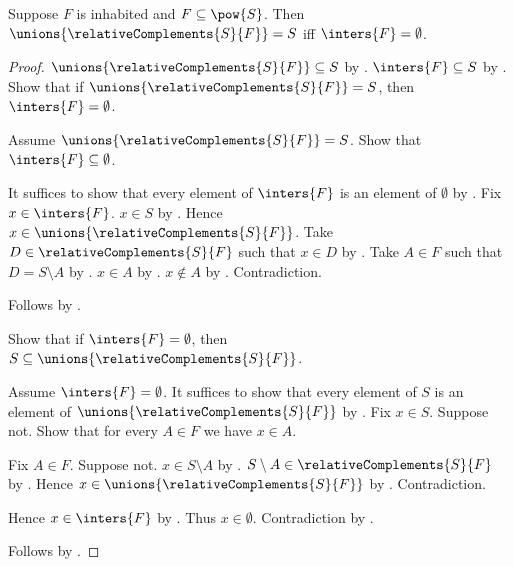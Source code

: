 \begin{proposition}\label{relative_complement_union_iff_intersection_empty}
    Suppose $F$ is inhabited and $F\subseteq\pow{S}$.
    Then $\unions{\relativeComplements{S}{F}}=S$ iff
        $\inters{F}=\emptyset$.
\end{proposition}
\begin{proof}
    $\unions{\relativeComplements{S}{F}}\subseteq S$
        by .
    $\inters{F}\subseteq S$
        by .
    Show that if $\unions{\relativeComplements{S}{F}}=S$, then
        $\inters{F}=\emptyset$.
    \begin{subproof}
        Assume $\unions{\relativeComplements{S}{F}}=S$.
        Show that $\inters{F}\subseteq\emptyset$.
        \begin{subproof}
            It suffices to show that every element of $\inters{F}$
                is an element of $\emptyset$ by .
            Fix $x\in\inters{F}$.
            $x\in S$ by .
            Hence $x\in\unions{\relativeComplements{S}{F}}$.
            Take $D\in\relativeComplements{S}{F}$ such that $x\in D$
                by .
            Take $A\in F$ such that $D=S\setminus A$
                by .
            $x\in A$ by .
            $x\notin A$ by .
            Contradiction.
        \end{subproof}
        Follows by .
    \end{subproof}
    Show that if $\inters{F}=\emptyset$, then
        $S\subseteq\unions{\relativeComplements{S}{F}}$.
    \begin{subproof}
        Assume $\inters{F}=\emptyset$.
        It suffices to show that every element of $S$ is an element of
            $\unions{\relativeComplements{S}{F}}$ by .
        Fix $x\in S$.
        Suppose not.
        Show that for every $A\in F$ we have $x\in A$.
        \begin{subproof}
            Fix $A\in F$.
            Suppose not.
            $x\in S\setminus A$ by .
            $S\setminus A\in\relativeComplements{S}{F}$
                by .
            Hence $x\in\unions{\relativeComplements{S}{F}}$
                by .
            Contradiction.
        \end{subproof}
        Hence $x\in\inters{F}$ by .
        Thus $x\in\emptyset$.
        Contradiction by .
    \end{subproof}
    Follows by .
\end{proof}
